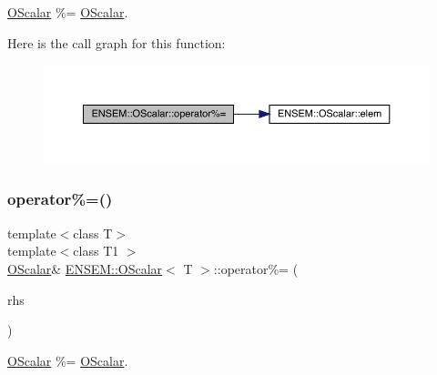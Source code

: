 \mbox{\hyperlink{classENSEM_1_1OScalar}{O\+Scalar}} \%= \mbox{\hyperlink{classENSEM_1_1OScalar}{O\+Scalar}}. 

Here is the call graph for this function\+:
\nopagebreak
\begin{figure}[H]
\begin{center}
\leavevmode
\includegraphics[width=350pt]{da/d80/classENSEM_1_1OScalar_a89a76b1229e185250c0b9c48ae13d98b_cgraph}
\end{center}
\end{figure}
\mbox{\label{classENSEM_1_1OScalar_a89a76b1229e185250c0b9c48ae13d98b}} 
\subsubsection{\texorpdfstring{operator\%=()}{operator\%=()}\hspace{0.1cm}{\footnotesize\ttfamily [2/2]}}
{\footnotesize\ttfamily template$<$class T$>$ \\
template$<$class T1 $>$ \\
\mbox{\hyperlink{classENSEM_1_1OScalar}{O\+Scalar}}\& \mbox{\hyperlink{classENSEM_1_1OScalar}{E\+N\+S\+E\+M\+::\+O\+Scalar}}$<$ T $>$\+::operator\%= (\begin{DoxyParamCaption}\item[{const \mbox{\hyperlink{classENSEM_1_1OScalar}{O\+Scalar}}$<$ T1 $>$ \&}]{rhs }\end{DoxyParamCaption})\hspace{0.3cm}{\ttfamily [inline]}}



\mbox{\hyperlink{classENSEM_1_1OScalar}{O\+Scalar}} \%= \mbox{\hyperlink{classENSEM_1_1OScalar}{O\+Scalar}}. 

